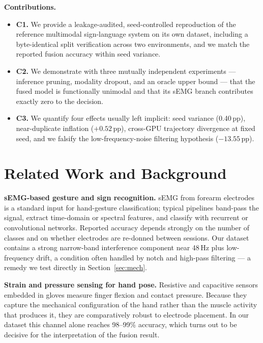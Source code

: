 \documentclass[11pt,a4paper]{article}
\begin{document}
\noindent\textbf{Contributions.}
\begin{itemize}[leftmargin=1.4em,itemsep=1pt]
\item \textbf{C1.} We provide a leakage-audited, seed-controlled reproduction of the reference multimodal sign-language system on its own dataset, including a byte-identical split verification across two environments, and we match the reported fusion accuracy within seed variance.
\item \textbf{C2.} We demonstrate with three mutually independent experiments --- inference pruning, modality dropout, and an oracle upper bound --- that the fused model is functionally unimodal and that its sEMG branch contributes exactly zero to the decision.
\item \textbf{C3.} We quantify four effects usually left implicit: seed variance (0.40\,pp), near-duplicate inflation ($+0.52$\,pp), cross-GPU trajectory divergence at fixed seed, and we falsify the low-frequency-noise filtering hypothesis ($-13.55$\,pp).
\end{itemize}

\section{Related Work and Background}

\textbf{sEMG-based gesture and sign recognition.} sEMG from forearm electrodes is a standard input for hand-gesture classification; typical pipelines band-pass the signal, extract time-domain or spectral features, and classify with recurrent or convolutional networks. Reported accuracy depends strongly on the number of classes and on whether electrodes are re-donned between sessions. Our dataset contains a strong narrow-band interference component near 48\,Hz plus low-frequency drift, a condition often handled by notch and high-pass filtering --- a remedy we test directly in Section~\ref{sec:mech}.

\textbf{Strain and pressure sensing for hand pose.} Resistive and capacitive sensors embedded in gloves measure finger flexion and contact pressure. Because they capture the mechanical configuration of the hand rather than the muscle activity that produces it, they are comparatively robust to electrode placement. In our dataset this channel alone reaches 98--99\% accuracy, which turns out to be decisive for the interpretation of the fusion result.
\end{document}
